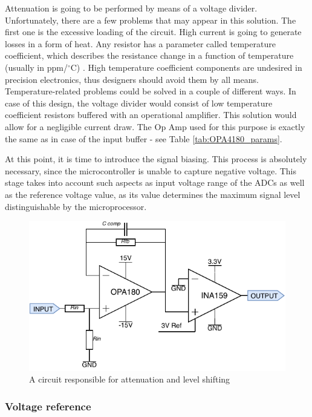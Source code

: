 \documentclass[12pt,a4paper]{article}
\begin{document}
Attenuation is going to be performed by means of a voltage divider. Unfortunately, there are a few problems that may appear in this solution. The first one is the excessive loading of the circuit. High current is going to generate losses in a form of heat. Any resistor has a parameter called temperature coefficient, which describes the resistance change in a function of temperature (usually in ppm/$^\circ$C) \cite{housekeeping}. High temperature coefficient components are undesired in precision electronics, thus designers should avoid them by all means.   Temperature-related problems could be solved in a couple of different ways. In case of this design, the voltage divider would consist of low temperature coefficient resistors buffered with an operational amplifier. This solution would allow for a negligible current draw. The Op Amp used for this purpose is exactly the same as in case of the input buffer - see Table \ref{tab:OPA4180_params}.
\par

At this point, it is time to introduce the signal biasing. This process is absolutely necessary, since the microcontroller is unable to capture negative voltage. This stage takes into account such aspects as input voltage range of the ADCs as well as the reference voltage value, as its value determines the maximum signal level distinguishable by the microprocessor.

\begin{figure}[ht!]
\includegraphics[scale=1.2]{input2.pdf}
\caption{A circuit responsible for attenuation and level shifting}
\label{fig:input2}
\end{figure}

\subsubsection{Voltage reference}
\end{document}
